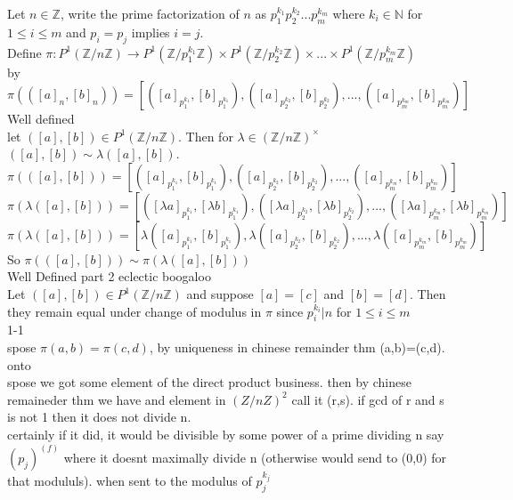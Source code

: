 \documentclass[11pt, oneside]{amsart}
\begin{document}
\subsubsection{}
Let $n\in\mathbb{Z}$, write the prime factorization of $n$ as $p_1^{k_1}p_2^{k_2}...p_m^{k_m}$ where $k_i\in\mathbb{N}$ for $1\leq i \leq m$ and $p_i=p_j$ implies $i=j$.
\\
Define $\pi: P^1(\mathbb{Z}/ n \mathbb{Z}) \rightarrow P^1(\mathbb{Z}/ p_1^{k_1} \mathbb{Z}) \times P^1(\mathbb{Z}/ p_2^{k_2} \mathbb{Z}) \times ... \times P^1(\mathbb{Z}/ p_m^{k_m} \mathbb{Z})$
\\
by $\pi(([a]_n, [b]_n)) = [([a]_{p_1^{k_1}},[b]_{p_1^{k_1}}), ([a]_{p_2^{k_2}},[b]_{p_2^{k_2}}),...,([a]_{p_m^{k_m}},[b]_{p_m^{k_m}})]$
\\
Well defined 
\\
let $([a],[b])\in P^1(\mathbb{Z}/ n \mathbb{Z})$.  Then for $\lambda \in (\mathbb{Z}/n\mathbb{Z})^{\times}$ $([a],[b]) \sim \lambda ([a],[b])$.  
\\
$\pi(([a],[b])) = [([a]_{p_1^{k_1}},[b]_{p_1^{k_1}}), ([a]_{p_2^{k_2}},[b]_{p_2^{k_2}}),...,([a]_{p_m^{k_m}},[b]_{p_m^{k_m}})]$
\\
$\pi(\lambda([a],[b])) = [([\lambda a]_{p_1^{k_1}}, [\lambda b]_{p_1^{k_1}}), ([\lambda a]_{p_2^{k_2}}, [\lambda b]_{p_2^{k_2}}),...,([\lambda a]_{p_m^{k_m}},[\lambda b]_{p_m^{k_m}})]$
\\
$\pi(\lambda([a],[b])) = [\lambda ([ a]_{p_1^{k_1}}, [ b]_{p_1^{k_1}}), \lambda ([ a]_{p_2^{k_2}}, [ b]_{p_2^{k_2}}),...,\lambda ([ a]_{p_m^{k_m}},[b]_{p_m^{k_m}})]$
\\
So $\pi(([a],[b])) \sim \pi(\lambda ([a],[b]))$
\\
Well Defined part 2 eclectic boogaloo
\\
Let $([a],[b])\in P^1(\mathbb{Z}/ n \mathbb{Z})$ and suppose $[a]=[c]$ and $[b]=[d]$. Then they remain equal under change of modulus in $\pi$ since $p_i^{k_i}|n$ for $1\leq i \leq m$
\\
1-1
\\
spose $\pi(a, b)=\pi(c,d)$, by uniqueness in chinese remainder thm (a,b)=(c,d).
\\
onto
\\
spose we got some element of the direct product business.  then by chinese remaineder thm we have and element in $(Z/nZ)^2$ call it (r,s).  if gcd of r and s is not 1 then it does not divide n.
\\certainly if it did, it would be divisible by some power of a prime dividing n say $(p_j)^(f)$ where it doesnt maximally divide n (otherwise would send to (0,0) for that modululs).  when sent to the modulus of $p_{j}^{k_j}$
\end{document}
